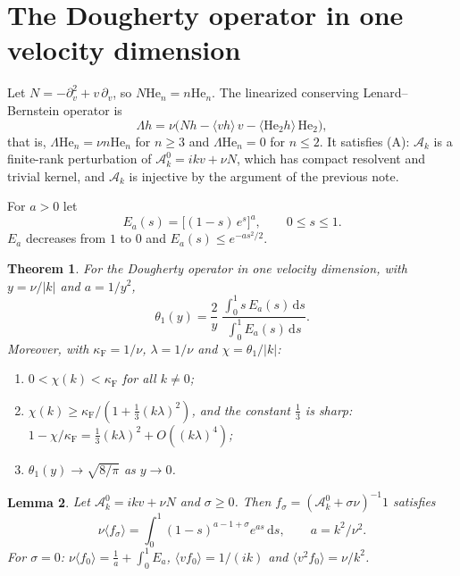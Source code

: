 \documentclass[11pt]{article}
\newcommand{\dd}{\mathrm{d}}
\newcommand{\He}{\mathrm{He}}
\newcommand{\cA}{\mathcal{A}}
\newcommand{\avg}[1]{\langle #1\rangle}
\newtheorem{theorem}{Theorem}
\newtheorem{lemma}[theorem]{Lemma}
\theoremstyle{remark}
\begin{document}
\section{The Dougherty operator in one velocity dimension}

Let $N=-\partial_v^2+v\,\partial_v$, so $N\He_n=n\He_n$. The linearized
conserving Lenard--Bernstein operator is
\begin{equation}
  \Lambda h = \nu\bigl(Nh-\avg{vh}\,v-\avg{\He_2h}\,\He_2\bigr),
\end{equation}
that is, $\Lambda\He_n=\nu n\He_n$ for $n\ge3$ and $\Lambda\He_n=0$ for
$n\le2$. It satisfies (A): $\cA_k$ is a finite-rank perturbation of
$\cA^0_k = ikv+\nu N$, which has compact resolvent and trivial kernel, and
$\cA_k$ is injective by the argument of the previous note.

For $a>0$ let
\begin{equation}
  E_a(s) = \bigl[(1-s)\,e^{s}\bigr]^{a},\qquad 0\le s\le1 .
\end{equation}
$E_a$ decreases from $1$ to $0$ and $E_a(s)\le e^{-as^2/2}$.

\begin{theorem}\label{thm:1d}
For the Dougherty operator in one velocity dimension, with $y=\nu/|k|$ and
$a=1/y^2$,
\begin{equation}
  \theta_1(y) = \frac{2}{y}\;
  \frac{\int_0^1 s\,E_a(s)\,\dd s}{\int_0^1E_a(s)\,\dd s} .
  \label{eq:th1}
\end{equation}
Moreover, with $\kappa_{\mathrm F}=1/\nu$, $\lambda=1/\nu$ and
$\chi=\theta_1/|k|$:
\begin{enumerate}
  \item[(a)] $0<\chi(k)<\kappa_{\mathrm F}$ for all $k\ne0$;
  \item[(b)] $\chi(k)\ge\kappa_{\mathrm F}/(1+\tfrac13(k\lambda)^2)$, and the
    constant $\tfrac13$ is sharp:
    $1-\chi/\kappa_{\mathrm F} = \tfrac13(k\lambda)^2+O((k\lambda)^4)$;
  \item[(c)] $\theta_1(y)\to\sqrt{8/\pi}$ as $y\to0$.
\end{enumerate}
\end{theorem}

\begin{lemma}\label{lem:semi}
Let $\cA^0_k=ikv+\nu N$ and $\sigma\ge0$. Then
$f_\sigma=(\cA^0_k+\sigma\nu)^{-1}1$ satisfies
\[
  \nu\avg{f_\sigma} = \int_0^1(1-s)^{a-1+\sigma}e^{as}\,\dd s,
  \qquad a=k^2/\nu^2 .
\]
For $\sigma=0$: $\nu\avg{f_0}=\tfrac1a+\int_0^1E_a$,
$\avg{vf_0}=1/(ik)$ and $\avg{v^2f_0}=\nu/k^2$.
\end{lemma}
\end{document}
